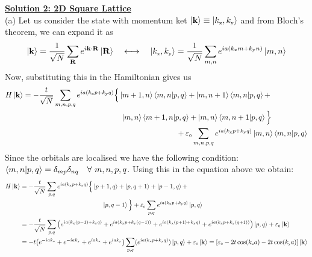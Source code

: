 \documentclass[usenames, svgnames, dvipsnames]{scrartcl}
\newcommand{\tund}[1]{_{\text{\tiny #1}}}
\begin{document}
\noindent
\underline{\textbf{{\sffamily Solution 2: 2D Square Lattice}}}
\\[0.3cm]
\noindent
(a) Let us consider the state with momentum ket $\ket{\vb{k}} \equiv \ket{k\tund{x}, k\tund{y}}$ and from Bloch's theorem, we can expand it as 
\begin{align*}
    \ket{\vb{k}} = \frac{1}{\sqrt{N}} \sum\limits_{\vb{R}} e^{i \vb{k}\cdot \vb{R}} \ket{\vb{R}}\quad \longleftrightarrow\quad \ket{k\tund{x}, k\tund{y}} = \frac{1}{\sqrt{N}} \sum\limits_{m,n} e^{ia (k\tund{x} m +k\tund{y}n )} \ket{m,n}
\end{align*}
Now, substituting this in the Hamiltonian gives us 
\begin{align*}
        H\ket{\vb{k}} &= -\frac{t}{\sqrt{N}} \sum\limits_{m,n,p,q}e^{ia(k\tund{x}p + k\tund{y}q )} \Big\{\ket{m+1,n}\braket{m,n|p,q}+\ket{m,n+1}\braket{m,n|p,q}+\\ &\qquad\qquad\qquad\qquad\quad\qquad\qquad\ket{m,n}\braket{m+1,n|p,q}+\ket{m,n}\braket{m,n+1|p,q}\Big\}\\ &\qquad\qquad\qquad\qquad\quad\hspace{4cm}+\varepsilon\tund{0}\sum\limits_{m,n,p,q} e^{ia(k\tund{x}p + k\tund{y}q )}\ket{m,n}\braket{m,n|p,q}
\end{align*}
Since the orbitals are localised we have the following condition: $\braket{m,n|p,q} = \delta_{mp}\delta_{nq}\quad \forall \ m,n,p,q$. Using this in the equation above we obtain: 
\begin{align*}
       H\ket{\vb{k}} &= -\frac{t}{\sqrt{N}} \sum\limits_{p,q}e^{ia(k\tund{x}p + k\tund{y}q )} \Big\{\ket{p+1,q}+\ket{p,q+1}+\ket{p-1,q}+\\ &\qquad\qquad\qquad\qquad\quad\qquad\qquad \ket{p,q-1}\Big\} +\varepsilon\tund{0} \sum\limits_{p,q}e^{ia(k\tund{x}p + k\tund{y}q )} \ket{p,q}\\
       &=-\frac{t}{\sqrt{N}} \sum\limits_{p,q}\qty(e^{ia(k\tund{x}(p-1) + k\tund{y}q )}+e^{ia(k\tund{x}p + k\tund{y}(q-1) )}+e^{ia(k\tund{x}(p+1) + k\tund{y}q )}+e^{ia(k\tund{x}p + k\tund{y}(q+1) )})\ket{p,q} + \varepsilon\tund{0}\ket{\vb{k}}\\
       &= -t\qty(e^{-iak\tund{x}} + e^{-iak\tund{y}}+e^{iak\tund{x}}+e^{iak\tund{y}})\sum\limits_{p,q}(e^{ia(k\tund{x}p + k\tund{y}q)})\ket{p,q}+ \varepsilon\tund{0}\ket{\vb{k}}=\qty[\varepsilon\tund{0}-2t\cos(k\tund{x}a) -2t \cos(k\tund{y}a)]\ket{\vb{k}}
\end{align*}
\end{document}

